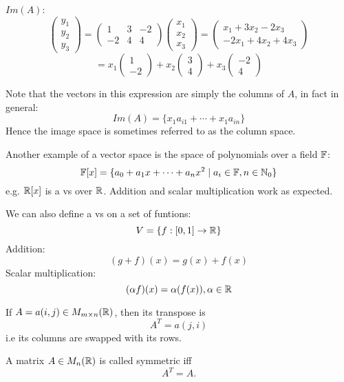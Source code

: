 \documentclass[a4paper,10pt]{article}
\begin{document}
\begin{ex}
	$Im(A)$:
	\[
		\begin{pmatrix}
			y_1 \\
			y_2 \\
			y_3
		\end{pmatrix}
		=
		\begin{pmatrix}
			1  & 3 & -2 \\
			-2 & 4 & 4
		\end{pmatrix}
		\begin{pmatrix}
			x_1 \\
			x_2 \\
			x_3
		\end{pmatrix}
		=
		\begin{pmatrix}
			x_1   + 3x_2 - 2x_3  \\
			-2x_1 + 4x_2 + 4x_3
		\end{pmatrix}
	\]
	\[
		= x_1
		\begin{pmatrix}
			1 \\
			-2
		\end{pmatrix}
		+ x_2
		\begin{pmatrix}
			3 \\
			4
		\end{pmatrix}
		+ x_3
		\begin{pmatrix}
			-2 \\
			4
		\end{pmatrix}
	\]

	Note that the vectors in this expression are simply the columns of $A$, in fact in general:
	\[ Im(A) = \{x_1 a_{i1} + \cdots + x_1 a_{in}\} \]
	Hence the image space is sometimes referred to as the column space.
\end{ex}

Another example of a vector space is the space of polynomials over a field $\mathbb{F}$:
\[
	\mathbb{F}[x] =
	\{a_0 + a_1 x + \cdots + a_n x^2 \mid a_i \in \mathbb{F}, n \in \mathbb{N}_0\}
\]
e.g. $\mathbb{R}[x]$ is a vs over $\mathbb{R}$.
Addition and scalar multiplication work as expected.

We can also define a vs on a set of funtions:
\[
	V = \{f:[0,1] \to \mathbb{R}\}
\]
Addition:
\[
	(g+f)(x) = g(x) + f(x)
\]
Scalar multiplication:
\[
	(\alpha f)(x) = \alpha (f(x)), \alpha \in \mathbb{R}
\]


\begin{defn}[Transpose]
	If $A = a(i,j) \in M_{m \times n}(\mathbb{R})$, then its transpose is
	\[ A^T = a(j,i) \]
	i.e its columns are swapped with its rows.
\end{defn}
\begin{defn}[Symmetric]
	A matrix $A \in M_{n}(\mathbb{R})$ is called symmetric iff
	\[ A^T = A. \]
\end{defn}
\end{document}
